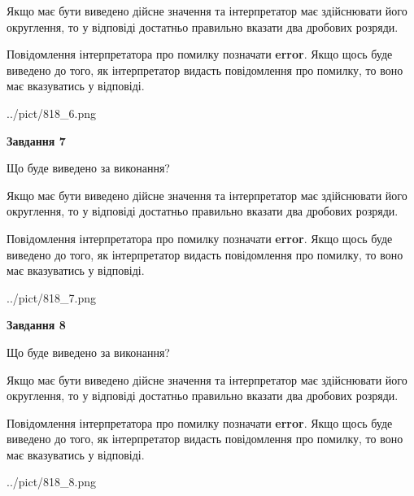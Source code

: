 \documentclass[12pt, ukrainian]{article}
\begin{document}
{\begin {Large}
Якщо має бути виведено дійсне значення та інтерпретатор має здійснювати його округлення, 
то у відповіді достатньо правильно вказати два дробових розряди.

Повідомлення інтерпретатора про помилку позначати \textbf{error}.
Якщо щось буде виведено до того, як інтерпретатор видасть повідомлення про помилку, 
то воно має вказуватись у відповіді. \par

\begin{center}
	{../pict/818_6.png}
\end{center}
\newpage

{\begin {center}\textbf{Завдання 7}\end {center}}\par
Що буде виведено за виконання? \par

Якщо має бути виведено дійсне значення та інтерпретатор має здійснювати його округлення, 
то у відповіді достатньо правильно вказати два дробових розряди.

Повідомлення інтерпретатора про помилку позначати \textbf{error}.
Якщо щось буде виведено до того, як інтерпретатор видасть повідомлення про помилку, 
то воно має вказуватись у відповіді. \par

\begin{center}
	{../pict/818_7.png}
\end{center}
\newpage

{\begin {center}\textbf{Завдання 8}\end {center}}\par
Що буде виведено за виконання? \par

Якщо має бути виведено дійсне значення та інтерпретатор має здійснювати його округлення, 
то у відповіді достатньо правильно вказати два дробових розряди.

Повідомлення інтерпретатора про помилку позначати \textbf{error}.
Якщо щось буде виведено до того, як інтерпретатор видасть повідомлення про помилку, 
то воно має вказуватись у відповіді. \par

\begin{center}
	{../pict/818_8.png}
\end{center}
\newpage


\end{Large}}
\end{document}
